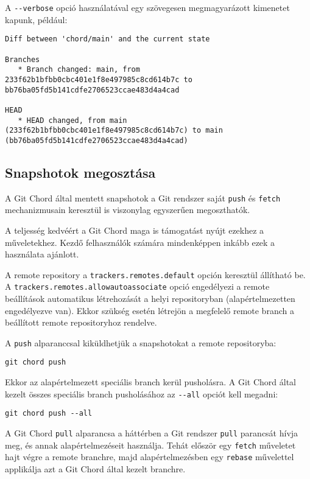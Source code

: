 \documentclass[
]{elteikthesis}[2025/03/25]
\begin{document}
A \verb|--verbose| opció használatával egy szövegesen megmagyarázott kimenetet kapunk, például:

\begin{verbatim}
Diff between 'chord/main' and the current state

Branches
   * Branch changed: main, from 233f62b1bfbb0cbc401e1f8e497985c8cd614b7c to bb76ba05fd5b141cdfe2706523ccae483d4a4cad

HEAD
   * HEAD changed, from main (233f62b1bfbb0cbc401e1f8e497985c8cd614b7c) to main (bb76ba05fd5b141cdfe2706523ccae483d4a4cad)
\end{verbatim}

\subsection{Snapshotok megosztása}

A Git Chord által mentett snapshotok a Git rendszer saját \verb|push| és \verb|fetch|
mechanizmusain keresztül is viszonylag egyszerűen megoszthatók.

A teljesség kedvéért a Git Chord maga is támogatást nyújt ezekhez a műveletekhez.
Kezdő felhasználók számára mindenképpen inkább ezek a használata ajánlott.

A remote repository a \verb|trackers.remotes.default| opción keresztül állítható be.
A \verb|trackers.remotes.allowautoassociate| opció engedélyezi a remote beállítások automatikus
létrehozását a helyi repositoryban (alapértelmezetten engedélyezve van).
Ekkor szükség esetén létrejön a megfelelő remote branch a beállított remote repositoryhoz rendelve.

A \verb|push| alparanccsal kiküldhetjük a snapshotokat a remote repositoryba:

\begin{verbatim}
git chord push
\end{verbatim}

Ekkor az alapértelmezett speciális branch kerül pusholásra.
A Git Chord által kezelt összes speciális branch pusholásához
az \verb|--all| opciót kell megadni:

\begin{verbatim}
git chord push --all
\end{verbatim}

A Git Chord \verb|pull| alparancsa a háttérben a Git rendszer \verb|pull| parancsát hívja meg,
és annak alapértelmezéseit használja.
Tehát először egy \verb|fetch| műveletet hajt végre a remote branchre,
majd alapértelmezésben egy \verb|rebase| művelettel applikálja azt a Git Chord által kezelt branchre.
\end{document}
